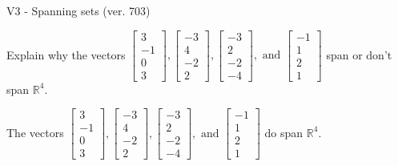 \begin{exercise}
  \begin{exerciseTitle}V3 - Spanning sets (ver. 703)\end{exerciseTitle}
  \begin{exerciseStatement}
    Explain why the vectors \(\left[\begin{array}{r}
3 \\
-1 \\
0 \\
3
\end{array}\right] , \left[\begin{array}{r}
-3 \\
4 \\
-2 \\
2
\end{array}\right] , \left[\begin{array}{r}
-3 \\
2 \\
-2 \\
-4
\end{array}\right] , \text{ and } \left[\begin{array}{r}
-1 \\
1 \\
2 \\
1
\end{array}\right]\) span or don't span \(\mathbb{R}^4\). 
	


  \end{exerciseStatement}
  \begin{exerciseAnswer}
   The vectors \(\left[\begin{array}{r}
3 \\
-1 \\
0 \\
3
\end{array}\right] , \left[\begin{array}{r}
-3 \\
4 \\
-2 \\
2
\end{array}\right] , \left[\begin{array}{r}
-3 \\
2 \\
-2 \\
-4
\end{array}\right] , \text{ and } \left[\begin{array}{r}
-1 \\
1 \\
2 \\
1
\end{array}\right]\) 
  	 do  
	span \(\mathbb{R}^4\).
  


  \end{exerciseAnswer}
\end{exercise}